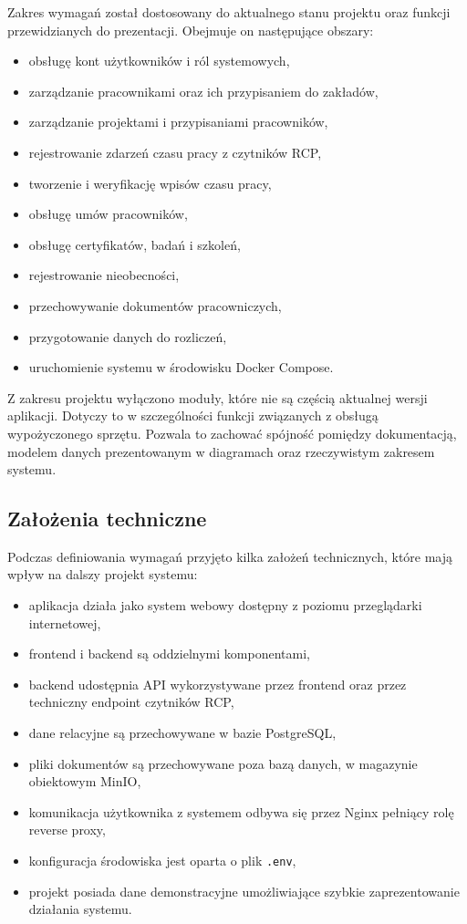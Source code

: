 Zakres wymagań został dostosowany do aktualnego stanu projektu oraz funkcji przewidzianych do prezentacji. Obejmuje on następujące obszary:
\begin{itemize}
    \item obsługę kont użytkowników i ról systemowych,
    \item zarządzanie pracownikami oraz ich przypisaniem do zakładów,
    \item zarządzanie projektami i przypisaniami pracowników,
    \item rejestrowanie zdarzeń czasu pracy z czytników RCP,
    \item tworzenie i weryfikację wpisów czasu pracy,
    \item obsługę umów pracowników,
    \item obsługę certyfikatów, badań i szkoleń,
    \item rejestrowanie nieobecności,
    \item przechowywanie dokumentów pracowniczych,
    \item przygotowanie danych do rozliczeń,
    \item uruchomienie systemu w środowisku Docker Compose.
\end{itemize}

Z zakresu projektu wyłączono moduły, które nie są częścią aktualnej wersji aplikacji. Dotyczy to w szczególności funkcji związanych z obsługą wypożyczonego sprzętu. Pozwala to zachować spójność pomiędzy dokumentacją, modelem danych prezentowanym w diagramach oraz rzeczywistym zakresem systemu.

\subsection{Założenia techniczne}

Podczas definiowania wymagań przyjęto kilka założeń technicznych, które mają wpływ na dalszy projekt systemu:
\begin{itemize}
    \item aplikacja działa jako system webowy dostępny z poziomu przeglądarki internetowej,
    \item frontend i backend są oddzielnymi komponentami,
    \item backend udostępnia API wykorzystywane przez frontend oraz przez techniczny endpoint czytników RCP,
    \item dane relacyjne są przechowywane w bazie PostgreSQL,
    \item pliki dokumentów są przechowywane poza bazą danych, w magazynie obiektowym MinIO,
    \item komunikacja użytkownika z systemem odbywa się przez Nginx pełniący rolę reverse proxy,
    \item konfiguracja środowiska jest oparta o plik \texttt{.env},
    \item projekt posiada dane demonstracyjne umożliwiające szybkie zaprezentowanie działania systemu.
\end{itemize}

